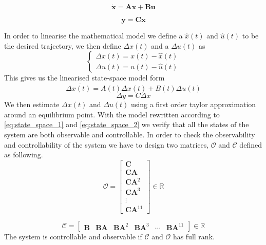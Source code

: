 \documentclass[journal]{IEEEtran}
\begin{document}
	\begin{equation} \label{eq:state_space_1}
			\bm{\dot x} = \bm{A} \bm{x} + \bm{B} \bm{u}
	\end{equation}
	
	\begin{equation} \label{eq:state_space_2}
	\bm{y} = \bm{C} \bm{x}
	\end{equation}	
	
In order to linearise the mathematical model we define a $\hat{x}(t)$ and $\hat{u}(t)$ to be the desired trajectory, we then define $\Delta x(t)$ and a $\Delta u(t)$ as
\begin{equation} \label{eq:linearisation}
	\left\lbrace {\begin{array}{c}	
	\Delta x(t) = x(t) - \hat{x}(t) \\
	 \Delta u(t) = u(t) - \hat{u}(t)
	\end{array} }\right.
\end{equation}	 
This gives us the linearised state-space model form \cite{SabatinoFrancesco2015Qcmn}
\begin{equation} \label{eq:linerstate}
	\Delta \dot{x(t)} = A(t) \Delta x(t) + B(t) \Delta u(t)
\end{equation}	
	\begin{equation} \label{eq:linearstate_2}
		\Delta y = C \Delta x
	\end{equation}
	We then estimate $\Delta x(t)$ and $\Delta u(t)$ using a first order taylor approximation around an equilibrium point.
	With the model rewritten according to \ref{eq:state_space_1} and \ref{eq:state_space_2} we verify that all the states of the system are both observable and controllable. In order to check the observability and controllability of the system we have to design two matrices, $\mathcal{O}$ and $\mathcal{C}$ defined as following.
	\begin{equation}\label{eq:observability}
	\mathcal{O} = 
	\left[ {\begin{array}{c}	
    \bm{C}\\
    \bm{CA}\\
    \bm{CA}^2\\
    \bm{CA}^3\\
    \vdots \\
    \bm{CA}^{11}
	\end{array} } \right] \in 
	\mathbb{R}
	\end{equation}
	
	
	\begin{equation}\label{eq:controlability}
	\mathcal{C} = \left[ {\begin{array}{cccccc}	
    \bm{B} & \bm{BA} & \bm{BA}^2 & \bm{BA}^3 & \cdots & \bm{BA}^{11}
	\end{array} } \right] \in 
	\mathbb{R}
	\end{equation}
The system is controllable and observable if $\mathcal{C}$ and $\mathcal{O}$ has full rank.\\
	
\end{document}
